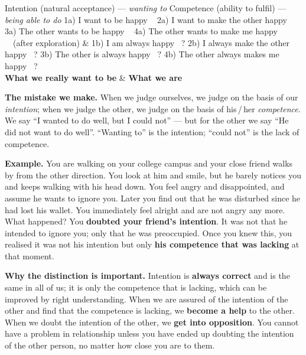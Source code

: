 \begin{cmptable}{Intention (natural acceptance) --- \emph{wanting to}}%
                {Competence (ability to fulfil) --- \emph{being able to do}}
1a) I want to be happy \ \checkmark\newline
2a) I want to make the other happy \ \checkmark\newline
3a) The other wants to be happy \ \checkmark\newline
4a) The other wants to make me happy \ \checkmark \ (after exploration) &
1b) I am always happy \ ?\newline
2b) I always make the other happy \ ?\newline
3b) The other is always happy \ ?\newline
4b) The other always makes me happy \ ? \\ \hline
\textbf{What we really want to be} & \textbf{What we are} \\ \hline
\end{cmptable}

\textbf{The mistake we make.} When we judge ourselves, we judge on the basis
of our \emph{intention}; when we judge the other, we judge on the basis of
his\,/\,her \emph{competence}. We say ``I wanted to do well, but I could
not'' --- but for the other we say ``He did not want to do well''. ``Wanting
to'' is the intention; ``could not'' is the lack of competence.

\textbf{Example.} You are walking on your college campus and your close friend
walks by from the other direction. You look at him and smile, but he barely
notices you and keeps walking with his head down. You feel angry and
disappointed, and assume he wants to ignore you. Later you find out that he
was disturbed since he had lost his wallet. You immediately feel alright and
are not angry any more. What happened? You \textbf{doubted your friend's
intention}. It was not that he intended to ignore you; only that he was
preoccupied. Once you knew this, you realised it was not his intention but
only \textbf{his competence that was lacking} at that moment.

\textbf{Why the distinction is important.} Intention is \textbf{always
correct} and is the same in all of us; it is only the competence that is
lacking, which can be improved by right understanding. When we are assured of
the intention of the other and find that the competence is lacking, we
\textbf{become a help} to the other. When we doubt the intention of the other,
we \textbf{get into opposition}. You cannot have a problem in relationship
unless you have ended up doubting the intention of the other person, no matter
how close you are to them.

